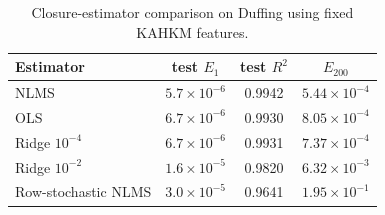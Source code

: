 \begin{table}[t]
\centering
\small
\caption{Closure-estimator comparison on Duffing using fixed KAHKM features.}
\label{tab:estimators}
\begin{tabular}{lccc}
\toprule
Estimator & test $E_1$ & test $R^2$ & $E_{200}$ \\
\midrule
NLMS & $5.7\times10^{-6}$ & 0.9942 & $5.44\times10^{-4}$ \\
OLS & $6.7\times10^{-6}$ & 0.9930 & $8.05\times10^{-4}$ \\
Ridge $10^{-4}$ & $6.7\times10^{-6}$ & 0.9931 & $7.37\times10^{-4}$ \\
Ridge $10^{-2}$ & $1.6\times10^{-5}$ & 0.9820 & $6.32\times10^{-3}$ \\
Row-stochastic NLMS & $3.0\times10^{-5}$ & 0.9641 & $1.95\times10^{-1}$ \\
\bottomrule
\end{tabular}
\end{table}
